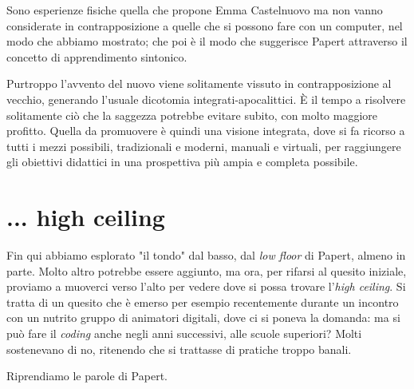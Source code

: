 Sono esperienze fisiche quella che propone Emma Castelnuovo ma non vanno considerate in contrapposizione a quelle che si possono fare con un computer, nel modo che abbiamo mostrato; che poi è il modo che suggerisce Papert attraverso il concetto di apprendimento sintonico. 

Purtroppo l'avvento del nuovo viene solitamente vissuto in contrapposizione al vecchio, generando l'usuale dicotomia integrati-apocalittici. È il tempo a risolvere solitamente ciò che la saggezza potrebbe evitare subito, con molto maggiore profitto. Quella da promuovere è quindi una visione integrata, dove si fa ricorso a tutti i mezzi possibili, tradizionali e moderni, manuali e virtuali, per raggiungere gli obiettivi didattici in una prospettiva più ampia e completa possibile.


\section{... high ceiling}

Fin qui abbiamo esplorato "il tondo" dal basso, dal \textit{low floor} di Papert, almeno in parte. Molto altro potrebbe essere aggiunto, ma ora, per rifarsi al quesito iniziale, proviamo a muoverci verso l'alto per vedere dove si possa trovare l'\textit{high ceiling}. Si tratta di un quesito che è emerso per esempio recentemente durante un incontro con un nutrito gruppo di animatori digitali, dove ci si poneva la domanda: ma si può fare il \textit{coding} anche negli anni successivi, alle scuole superiori? Molti sostenevano di no, ritenendo che si trattasse di pratiche troppo banali.

Riprendiamo le parole di Papert.

